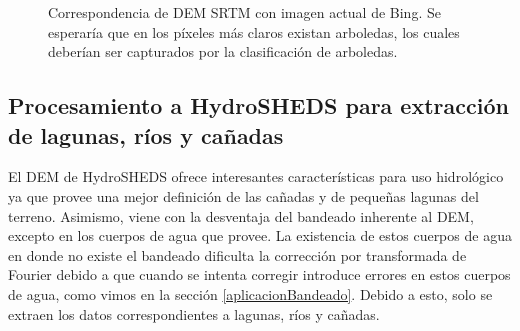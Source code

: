 \documentclass[10pt,a4paper, twoside]{report}
\begin{document}
\begin{figure}[H]
	\centering
	\caption{Correspondencia de DEM SRTM con imagen actual de Bing. Se esperaría que en los píxeles más claros existan arboledas, los cuales deberían ser capturados por la clasificación de arboledas.} \label{fig:observacionArboledas}
\end{figure}


\subsection{Procesamiento a HydroSHEDS para extracción de lagunas, ríos y cañadas}

El DEM de HydroSHEDS ofrece interesantes características para uso hidrológico ya que provee una mejor definición de las cañadas y de pequeñas lagunas del terreno. Asimismo, viene con la desventaja del bandeado inherente al DEM, excepto en los cuerpos de agua que provee. La existencia de estos cuerpos de agua en donde no existe el bandeado dificulta la corrección por transformada de Fourier debido a que cuando se intenta corregir introduce errores en estos cuerpos de agua, como vimos en la sección \ref{aplicacionBandeado}. Debido a esto, solo se extraen los datos correspondientes a lagunas, ríos y cañadas.
\end{document}
